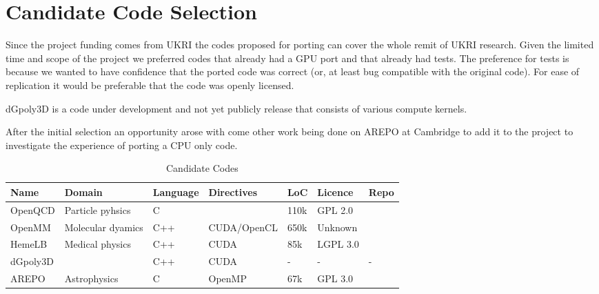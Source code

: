 
\section{Candidate Code Selection}\label{sec:codesel}
Since the project funding comes from UKRI the codes proposed for porting can cover the whole remit of UKRI research.
Given the limited time and scope of the project we preferred codes that already had a GPU port and that already had tests.
The preference for tests is because we wanted to have confidence that the ported code was correct (or, at least bug compatible with the original code).
For ease of replication it would be preferable that the code was openly licensed.

dGpoly3D is a code under development and not yet publicly release that consists of various compute kernels.

After the initial selection an opportunity arose with come other work being done on AREPO at Cambridge to add it to the project to investigate the experience of porting a CPU only code.

\begin{table}[htb]\small
	\centering
	\begin{tabular}{lllllll}
		Name     & Domain            & Language & Directives  & LoC  & Licence  & Repo                                                \\
		\hline
		OpenQCD  & Particle pyhsics  & C        &             & 110k & GPL 2.0  & \cite{fastsum_collaboration_openqcd-fastsum_nodate} \\
		OpenMM   & Molecular dyamics & C++      & CUDA/OpenCL & 650k & Unknown  & \cite{noauthor_openmm_nodate}                       \\
		HemeLB   & Medical physics   & C++      & CUDA        & 85k  & LGPL 3.0 & \cite{hemelb_authors_hemelb_nodate}                 \\
		dGpoly3D &                   & C++      & CUDA        & -    & -        & -                                                   \\
		AREPO    & Astrophysics      & C        & OpenMP      & 67k  & GPL 3.0  & \cite{weinberger_arepo_2020}
	\end{tabular}
	\caption{Candidate Codes}
	\label{tab:candidate codes}
\end{table}
